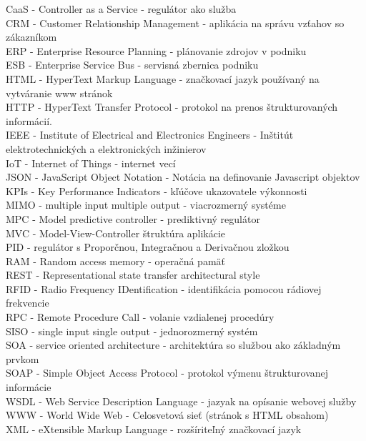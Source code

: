 CaaS - Controller as a Service - regulátor ako služba \\
CRM - Customer Relationship Management - aplikácia na správu vzťahov so zákazníkom \\
ERP - Enterprise Resource Planning - plánovanie zdrojov v podniku \\
ESB - Enterprise Service Bus - servisná zbernica podniku \\
HTML - HyperText Markup Language - značkovací jazyk používaný na vytváranie www stránok \\
HTTP - HyperText Transfer Protocol - protokol na prenos štrukturovaných informácií. \\
IEEE - Institute of Electrical and Electronics Engineers - Inštitút elektrotechnických a elektronických inžinierov \\
IoT - Internet of Things - internet vecí \\
JSON - JavaScript Object Notation - Notácia na definovanie Javascript objektov \\
KPIs - Key Performance Indicators - kľúčove ukazovatele výkonnosti \\
MIMO - multiple input multiple output - viacrozmerný systéme \\
MPC - Model predictive controller - prediktivný regulátor \\
MVC - Model-View-Controller štruktúra aplikácie \\
PID - regulátor s Proporčnou, Integračnou a Derivačnou zložkou \\
RAM - Random access memory - operačná pamäť \\
REST - Representational state transfer architectural style \\
RFID - Radio Frequency IDentification - identifikácia pomocou rádiovej frekvencie \\
RPC - Remote Procedure Call - volanie vzdialenej procedúry \\
SISO - single input single output - jednorozmerný systém \\
SOA - service oriented architecture - architektúra so službou ako základným prvkom \\
SOAP - Simple Object Access Protocol - protokol výmenu štrukturovanej informácie \\
WSDL - Web Service Description Language - jazyak na opísanie webovej služby \\
WWW - World Wide Web - Celosvetová sieť (stránok s HTML obsahom) \\
XML - eXtensible Markup Language - rozšíriteľný značkovací jazyk
